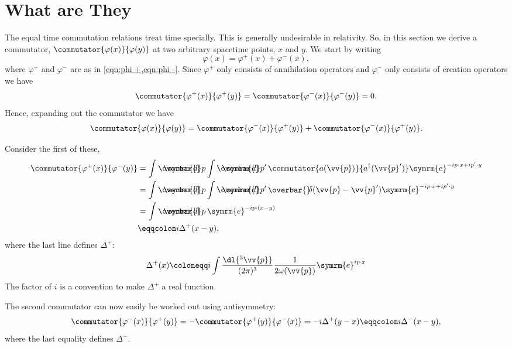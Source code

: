 \documentclass[fleqn]{NotesClass}
\newcommand{\e}{\symrm{e}}
\newcommand{\hermit}{{\dagger}}
\newcommand{\dbar}[1][0.0]{\ThisStyle{\ensurestackMath{%
            \stackengine{#1\LMex}{\SavedStyle \symrm{d}}{\SavedStyle\overbar{}%
                \mkern2.25mu}{O}{r}{F}{F}{L}}}}
\newcommand{\invariantmeasure}[1]{%
    \mathchoice{\dbar #1}{\dbar #1}{\dbar[.05] #1}{\dbar[.06] #1}
}
\newcommand\bardelta{\ThisStyle{\ensurestackMath{%
            \stackengine{-.3\LMpt}{\SavedStyle \delta}{\SavedStyle\overbar{}%
                \mkern4.5mu}{O}{r}{F}{F}{L}}}}
\begin{document}
    \section{What are They}\label{sec:covariant commutators what are they}
    The equal time commutation relations treat time specially.
    This is generally undesirable in relativity.
    So, in this section we derive a commutator, \(\commutator{\varphi(x)}{\varphi(y)}\) at two arbitrary spacetime points, \(x\) and \(y\).
    We start by writing
    \begin{equation}
        \varphi(x) = \varphi^+(x) + \varphi^-(x),
    \end{equation}
    where \(\varphi^+\) and \(\varphi^-\) are as in \cref{eqn:phi +,eqn:phi -}.
    Since \(\varphi^+\) only consists of annihilation operators and \(\varphi^-\) only consists of creation operators we have
    \begin{equation}
        \commutator{\varphi^+(x)}{\varphi^+(y)} = \commutator{\varphi^-(x)}{\varphi^-(y)} = 0.
    \end{equation}
    Hence, expanding out the commutator we have
    \begin{equation}
        \commutator{\varphi(x)}{\varphi(y)} = \commutator{\varphi^-(x)}{\varphi^+(y)} + \commutator{\varphi^-(x)}{\varphi^+(y)}.
    \end{equation}
    
    Consider the first of these,
    \begin{align}
        \commutator{\varphi^+(x)}{\varphi^-(y)} &= \int \invariantmeasure{p} \int \invariantmeasure{p'} \, \commutator{a(\vv{p})}{a^\hermit(\vv{p}')} \e^{-ip\cdot x + ip'\cdot y}\\
        &= \int \invariantmeasure{p} \int \invariantmeasure{p'} \, \bardelta(\vv{p} - \vv{p}') \e^{-ip\cdot x + ip' \cdot y}\\
        &= \int \invariantmeasure{p} \, \e^{-ip \cdot (x - y)}\\
        &\eqqcolon i\Delta^+(x - y),
    \end{align}
    where the last line defines \(\Delta^+\):
    \begin{equation}
        \Delta^+(x) \coloneqq i \int \frac{\dl{^3\vv{p}}}{(2\pi)^3} \frac{1}{2\omega(\vv{p})} \e^{ip\cdot x}
    \end{equation}
    The factor of \(i\) is a convention to make \(\Delta^+\) a real function.
    
    The second commutator can now easily be worked out using antisymmetry:
    \begin{equation}
        \commutator{\varphi^-(x)}{\varphi^+(y)} = -\commutator{\varphi^+(y)}{\varphi^-(x)} = -i\Delta^+(y - x) \eqqcolon i\Delta^-(x - y),
    \end{equation}
    where the last equality defines \(\Delta^-\).
    
\end{document}
